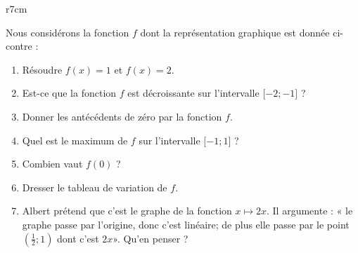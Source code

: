 
\begin{exercice}\label{exosmath-0570}

\begin{wrapfigure}{r}{7cm}
   \vspace{-0.5cm}        %
   \centering
   
\end{wrapfigure}

    Nous considérons la fonction \( f\) dont la représentation graphique est donnée ci-contre :

    \begin{enumerate}
        \item
            Résoudre \( f(x)=1\) et \( f(x)=2\).
        \item
            Est-ce que la fonction \( f\) est décroissante sur l'intervalle \( \mathopen[ -2 ;-1 \mathclose]\) ?
        \item
            Donner les antécédents de zéro par la fonction \( f\).
        \item
            Quel est le maximum de \( f\) sur l'intervalle \( \mathopen[ -1 ;1 \mathclose]\) ?
        \item 
            Combien vaut \( f(0)\) ?
        \item
            Dresser le tableau de variation de \( f\).
        \item
            Albert prétend que c'est le graphe de la fonction \( x\mapsto 2x\). Il argumente : « le graphe passe par l'origine, donc c'est linéaire; de plus elle passe par le point \( (\frac{ 1 }{2};1)\) dont c'est \( 2x\)». Qu'en penser ?
    \end{enumerate}

\end{exercice}
